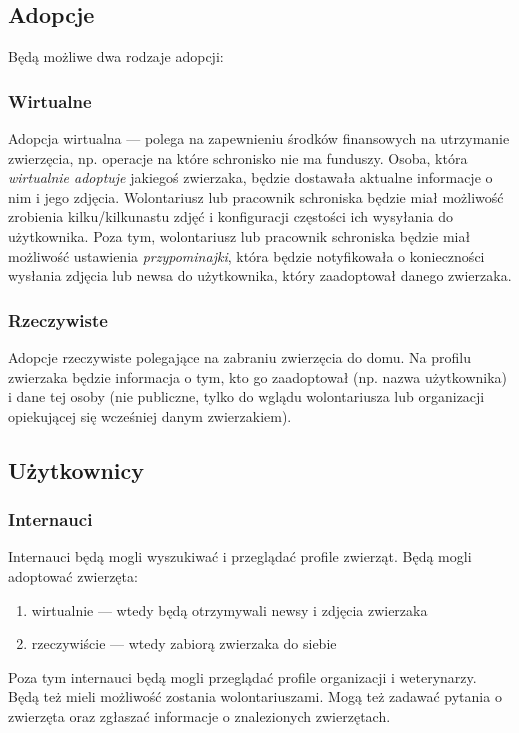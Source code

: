 \documentclass[10pt,a4paper]{article}
\begin{document}
\subsection{Adopcje}
Będą możliwe dwa rodzaje adopcji:
 

\subsubsection{Wirtualne}
Adopcja wirtualna --- polega na zapewnieniu środków finansowych na utrzymanie zwierzęcia, np. operacje na które schronisko nie ma funduszy. Osoba, która \emph{wirtualnie adoptuje} jakiegoś zwierzaka, będzie dostawała aktualne informacje o nim i jego zdjęcia. Wolontariusz lub pracownik schroniska będzie miał możliwość zrobienia kilku/kilkunastu zdjęć i konfiguracji częstości ich wysyłania do użytkownika. Poza tym, wolontariusz lub pracownik schroniska będzie miał możliwość ustawienia \emph{przypominajki}, która będzie notyfikowała o konieczności wysłania zdjęcia lub newsa do użytkownika, który zaadoptował danego zwierzaka.
\subsubsection{Rzeczywiste}
Adopcje rzeczywiste polegające na zabraniu zwierzęcia do domu. Na profilu zwierzaka będzie informacja o tym, kto go zaadoptował (np. nazwa użytkownika) i dane tej osoby (nie publiczne, tylko do wglądu wolontariusza lub organizacji opiekującej się wcześniej danym zwierzakiem).
 
\subsection{Użytkownicy}

\subsubsection{Internauci}
Internauci będą mogli wyszukiwać i przeglądać profile zwierząt. Będą mogli adoptować zwierzęta:
\begin{enumerate}
	\item wirtualnie --- wtedy będą otrzymywali newsy i zdjęcia zwierzaka
	\item rzeczywiście --- wtedy zabiorą zwierzaka do siebie
\end{enumerate}
Poza tym internauci będą mogli przeglądać profile organizacji i weterynarzy. Będą też mieli możliwość zostania wolontariuszami. Mogą też zadawać pytania o zwierzęta oraz zgłaszać informacje o znalezionych zwierzętach.
 
\end{document}
